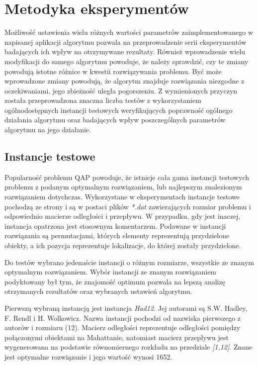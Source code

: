 \chapter{Metodyka eksperymentów}
\label{cha:metodyka}

Możliwość ustawienia wielu różnych wartości parametrów zaimplementowanego w napisanej aplikacji algorytmu pozwala na przeprowadzenie serii eksperymentów badających ich wpływ na otrzymywane rezultaty. Również wprowadzenie wielu modyfikacji do samego algorytmu powoduje, że należy sprawdzić, czy te zmiany powodują istotne różnice w kwestii rozwiązywania problemu. Być może wprowadzone zmiany powodują, że algorytm znajduje rozwiązania niezgodne z oczekiwaniami, jego zbieżność uległa pogorszeniu. Z wymienionych przyczyn została przeprowadzona znaczna liczba testów z wykorzystaniem ogólnodostępnych instancji testowych weryfikujących poprawność ogólnego działania algorytmu oraz badających wpływ poszczególnych parametrów algorytmu na jego działanie.
 
\section{Instancje testowe}
\label{sec:instancje}
Popularność problemu QAP powoduje, że istnieje cała gama instancji testowych problemu z podanym optymalnym rozwiązaniem, lub najlepszym znalezionym rozwiązaniem dotychczas. Wykorzystane w eksperymentach instancje testowe pochodzą ze strony \cite{INSTANCJE} i są w postaci plików \textit{*.dat} zawierających rozmiar problemu i odpowiednio macierze odległości i przepływu. W przypadku, gdy jest inaczej, instancja opatrzona jest stosownym komentarzem. Podawane w instancji rozwiązania są permutacjami, których elementy reprezentują przydzielone obiekty, a ich pozycja reprezentuje lokalizacje, do której zostały przydzielone.

Do testów wybrano jedenaście instancji o różnym rozmiarze, wszystkie ze znanym optymalnym rozwiązaniem. Wybór instancji ze znanym rozwiązaniem podyktowany był tym, że znajomość optimum pozwala na lepszą analizę otrzymanych rezultatów oraz wybranych ustawień algorytmu.

Pierwszą wybraną instancją jest instancja \textit{Had12}. Jej autorami są S.W. Hadley, F. Rendl i H. Wolkowicz. Nazwa instancji pochodzi od nazwiska pierwszego z autorów i rozmiaru (12). Macierz odległości reprezentuje odległości pomiędzy połączonymi obiektami na Mahattanie, natomiast macierz przepływu jest wygenerowana na podstawie równomiernego rozkładu na przedziale \textit{[1,12]}. Znane jest optymalne rozwiązanie i jego wartość wynosi 1652.

